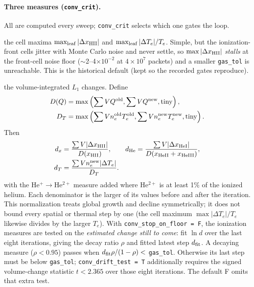 \documentclass[english,a4paper]{my_memo}
\newcommand{\code}[1]{\texttt{#1}}
\begin{document}
\paragraph{Three measures (\code{conv\_crit}).}  All are computed every sweep;
\code{conv\_crit} selects which one gates the loop.
\begin{description}\itemsep2pt
\item[\code{'cell'}] the cell maxima $\max_{\rm leaf}|\Delta x_{\rm HII}|$ and
  $\max_{\rm leaf}|\Delta T_e|/T_e$.  Simple, but the ionization-front cells
  jitter with Monte Carlo noise and never settle, so $\max|\Delta x_{\rm HII}|$
  \emph{stalls} at the front-cell noise floor ($\sim$2--4$\times10^{-2}$ at
  $4\times10^7$ packets) and a smaller \code{gas\_tol} is unreachable.  This is
  the historical default (kept so the recorded gates reproduce).
\item[\code{'vol'}] the volume-integrated $L_1$ changes. Define
  \[
  \begin{aligned}
    D(Q)&=\max\left(\sum VQ^{\rm old},\sum VQ^{\rm new},\mathrm{tiny}\right),\\
    D_T&=\max\left(\sum Vn_e^{\rm old}T_e^{\rm old},
                       \sum Vn_e^{\rm new}T_e^{\rm new},\mathrm{tiny}\right).
  \end{aligned}
  \]
  Then
  \[
  \begin{aligned}
    d_x&=\frac{\sum V|\Delta x_{\rm HII}|}{D(x_{\rm HII})},\qquad
    d_{\rm He}=\frac{\sum V|\Delta x_{\rm HeI}|}{D(x_{\rm HeII}+x_{\rm HeIII})},\\
    d_T&=\frac{\sum Vn_e^{\rm new}|\Delta T_e|}{D_T}.
  \end{aligned}
  \]
  with the He$^+\to$He$^{2+}$ measure added where He$^{2+}$ is at least 1\%
  of the ionized helium.  Each denominator is the larger of its values
  before and after the iteration.  This normalization treats global growth
  and decline symmetrically; it does not bound every spatial or thermal
  step by one (the cell maximum
  $\max|\Delta T_e|/T_e$ likewise divides by the larger $T_e$).  With \code{conv\_stop\_on\_floor = F}, the ionization measures are tested on the
  \emph{estimated change still to come}: fit $\ln d$ over the last eight
  iterations, giving the decay ratio $\rho$ and fitted latest step
  $d_{\rm fit}$.  A decaying measure ($\rho < 0.95$) passes when
  $d_{\rm fit}\rho/(1-\rho) <$ \code{gas\_tol}.  Otherwise its last
  step must be below \code{gas\_tol}; \code{conv\_drift\_test = T}
  additionally requires the signed volume-change statistic $t < 2.365$
  over those eight iterations.  The default F omits that extra test.

\end{description}
\end{document}
